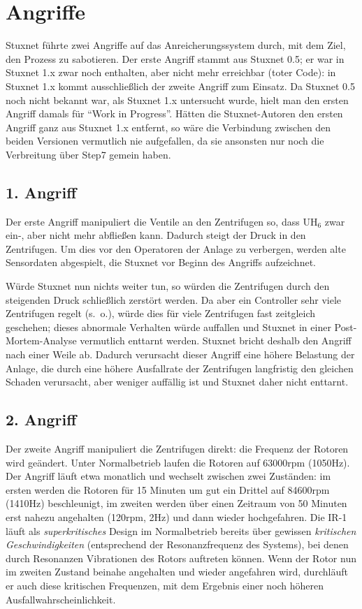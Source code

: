 \documentclass{article}
\begin{document}
\section{Angriffe}

Stuxnet führte zwei Angriffe auf das Anreicherungssystem durch, mit dem Ziel, den Prozess zu sabotieren.
Der erste Angriff stammt aus Stuxnet 0.5;
er war in Stuxnet 1.x zwar noch enthalten, aber nicht mehr erreichbar (toter Code):
in Stuxnet 1.x kommt ausschließlich der zweite Angriff zum Einsatz.
Da Stuxnet 0.5 noch nicht bekannt war, als Stuxnet 1.x untersucht wurde,
hielt man den ersten Angriff damals für ``Work in Progress''.
Hätten die Stuxnet-Autoren den ersten Angriff ganz aus Stuxnet 1.x entfernt,
so wäre die Verbindung zwischen den beiden Versionen vermutlich nie aufgefallen,
da sie ansonsten nur noch die Verbreitung über Step7 gemein haben.

\subsection{1. Angriff}

Der erste Angriff manipuliert die Ventile an den Zentrifugen so,
dass $\mathrm{UH}_6$ zwar ein-, aber nicht mehr abfließen kann.
Dadurch steigt der Druck in den Zentrifugen.
Um dies vor den Operatoren der Anlage zu verbergen,
werden alte Sensordaten abgespielt, die Stuxnet vor Beginn des Angriffs aufzeichnet.

Würde Stuxnet nun nichts weiter tun, so würden die Zentrifugen durch den steigenden Druck schließlich zerstört werden.
Da aber ein Controller sehr viele Zentrifugen regelt (s.~o.), würde dies für viele Zentrifugen fast zeitgleich geschehen;
dieses abnormale Verhalten würde auffallen und Stuxnet in einer Post-Mortem-Analyse vermutlich enttarnt werden.
Stuxnet bricht deshalb den Angriff nach einer Weile ab.
Dadurch verursacht dieser Angriff eine höhere Belastung der Anlage,
die durch eine höhere Ausfallrate der Zentrifugen langfristig den gleichen Schaden verursacht,
aber weniger auffällig ist und Stuxnet daher nicht enttarnt.

\subsection{2. Angriff}

Der zweite Angriff manipuliert die Zentrifugen direkt: die Frequenz der Rotoren wird geändert.
Unter Normalbetrieb laufen die Rotoren auf 63000rpm (1050Hz).
Der Angriff läuft etwa monatlich und wechselt zwischen zwei Zuständen:
im ersten werden die Rotoren für 15 Minuten um gut ein Drittel auf 84600rpm (1410Hz) beschleunigt,
im zweiten werden über einen Zeitraum von 50 Minuten erst nahezu angehalten (120rpm, 2Hz) und dann wieder hochgefahren.
Die IR-1 läuft als \emph{superkritisches} Design im Normalbetrieb bereits über gewissen \emph{kritischen Geschwindigkeiten}
(entsprechend der Resonanzfrequenz des Systems), bei denen durch Resonanzen Vibrationen des Rotors auftreten können.
Wenn der Rotor nun im zweiten Zustand beinahe angehalten und wieder angefahren wird,
durchläuft er auch diese kritischen Frequenzen, mit dem Ergebnis einer noch höheren Ausfallwahrscheinlichkeit.
\end{document}
